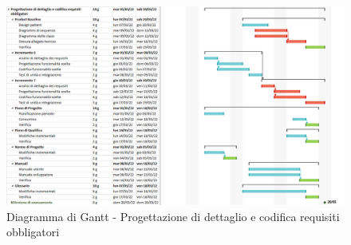 \begin{figure}[H]
  \centering
   \includegraphics[scale=0.52]{immagini/prog_requisiti_obbligatori.png}
   \caption{Diagramma di Gantt - Progettazione di dettaglio e codifica requisiti obbligatori}
 \end{figure}
 \pagebreak


